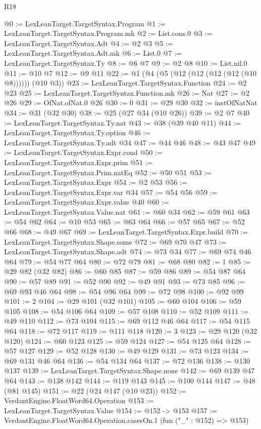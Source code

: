 \begin{lexlean}{R18}
\begin{coremodule}
@0 := LexLeanTarget.TargetSyntax.Program
@1 := LexLeanTarget.TargetSyntax.Program.mk
@2 := List.cons.{0}
@3 := LexLeanTarget.TargetSyntax.Adt
@4 := @2 @3
@5 := LexLeanTarget.TargetSyntax.Adt.mk
@6 := List.{0}
@7 := LexLeanTarget.TargetSyntax.Ty
@8 := @6 @7
@9 := @2 @8
@10 := List.nil.{0}
@11 := @10 @7
@12 := @9 @11
@22 := @1 (@4 (@5 (@12 (@12 (@12 (@12 (@10 @8)))))) (@10 @3))
@23 := LexLeanTarget.TargetSyntax.Function
@24 := @2 @23
@25 := LexLeanTarget.TargetSyntax.Function.mk
@26 := Nat
@27 := @2 @26
@29 := OfNat.ofNat.{0} @26
@30 := 0
@31 := @29 @30
@32 := instOfNatNat
@34 := @31 (@32 @30)
@38 := @25 (@27 @34 (@10 @26))
@39 := @2 @7
@40 := LexLeanTarget.TargetSyntax.Ty.nat
@43 := @38 (@39 @40 @11)
@44 := LexLeanTarget.TargetSyntax.Ty.option
@46 := LexLeanTarget.TargetSyntax.Ty.adt @34
@47 := @44 @46
@48 := @43 @47
@49 := LexLeanTarget.TargetSyntax.Expr.cond
@50 := LexLeanTarget.TargetSyntax.Expr.prim
@51 := LexLeanTarget.TargetSyntax.Prim.natEq
@52 := @50 @51
@53 := LexLeanTarget.TargetSyntax.Expr
@54 := @2 @53
@56 := LexLeanTarget.TargetSyntax.Expr.var @34
@57 := @54 @56
@59 := LexLeanTarget.TargetSyntax.Expr.value @40
@60 := LexLeanTarget.TargetSyntax.Value.nat
@61 := @60 @34
@62 := @59 @61
@63 := @54 @62
@64 := @10 @53
@65 := @63 @64
@66 := @57 @65
@67 := @52 @66
@68 := @49 @67
@69 := LexLeanTarget.TargetSyntax.Expr.build
@70 := LexLeanTarget.TargetSyntax.Shape.some
@72 := @69 @70 @47
@73 := LexLeanTarget.TargetSyntax.Shape.adt
@74 := @73 @34
@77 := @69 @74 @46 @64
@79 := @54 @77 @64
@80 := @72 @79
@81 := @68 @80
@82 := 1
@85 := @29 @82 (@32 @82)
@86 := @60 @85
@87 := @59 @86
@89 := @54 @87 @64
@90 := @57 @89
@91 := @52 @90
@92 := @49 @91
@93 := @73 @85
@96 := @69 @93 @46 @64
@98 := @54 @96 @64
@99 := @72 @98
@100 := @92 @99
@101 := 2
@104 := @29 @101 (@32 @101)
@105 := @60 @104
@106 := @59 @105
@108 := @54 @106 @64
@109 := @57 @108
@110 := @52 @109
@111 := @49 @110
@112 := @73 @104
@115 := @69 @112 @46 @64
@117 := @54 @115 @64
@118 := @72 @117
@119 := @111 @118
@120 := 3
@123 := @29 @120 (@32 @120)
@124 := @60 @123
@125 := @59 @124
@127 := @54 @125 @64
@128 := @57 @127
@129 := @52 @128
@130 := @49 @129
@131 := @73 @123
@134 := @69 @131 @46 @64
@136 := @54 @134 @64
@137 := @72 @136
@138 := @130 @137
@139 := LexLeanTarget.TargetSyntax.Shape.none
@142 := @69 @139 @47 @64
@143 := @138 @142
@144 := @119 @143
@145 := @100 @144
@147 := @48 (@81 @145)
@151 := @22 (@24 @147 (@10 @23))
@152 := VerdantEngine.FloatWord64.Operation
@153 := LexLeanTarget.TargetSyntax.Value
@154 := @152 -> @153
@157 := VerdantEngine.FloatWord64.Operation.casesOn.{1} (fun ("_" : @152) => @153)

\end{coremodule}
\end{lexlean}

